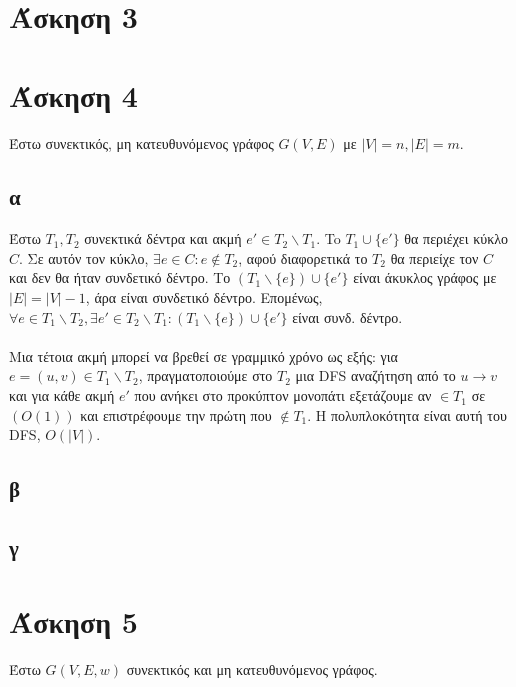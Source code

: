 \documentclass[12pt,a4paper]{article}
\begin{document}
  \section{Άσκηση 3}
  
  \section{Άσκηση 4}

  Έστω συνεκτικός, μη κατευθυνόμενος γράφος \( G(V, E) \) με \( |V| = n,
  |E| = m \).

  \subsection{α}

  Έστω \(T_1, T_2\) συνεκτικά δέντρα και ακμή \(e' \in T_2 \backslash T_1\).
  To \(T_1 \cup \{e'\}\) θα περιέχει κύκλο \(C\). Σε αυτόν τον κύκλο, \(\exists
  e \in C: e \notin T_2\), αφού διαφορετικά το \(Τ_2\) θα περιείχε τον \(C\)
  και δεν θα ήταν συνδετικό δέντρο. Το \((T_1 \backslash \{e\}) \cup \{e'\} \)
  είναι άκυκλος γράφος με \(|E| = |V| - 1\), άρα είναι συνδετικό δέντρο.
  Επομένως, \(\forall e \in T_1 \backslash T_2, \exists e' \in T_2 \backslash
  T_1: (T_1 \backslash \{e\}) \cup \{e'\}\) είναι συνδ. δέντρο.
  \\
  \\
  Μια τέτοια ακμή μπορεί να βρεθεί σε γραμμικό χρόνο ως εξής: για \(e = (u, v)
  \in T_1 \backslash T_2 \), πραγματοποιούμε στο \(T_2 \) μια {\latintext DFS}
  αναζήτηση από το \(u \rightarrow v\) και για κάθε ακμή \(e'\) που ανήκει στο
  προκύπτον μονοπάτι εξετάζουμε αν \(\in Τ_1\) σε \((O(1))\) και επιστρέφουμε 
  την πρώτη που \(\notin T_1\). Η πολυπλοκότητα είναι αυτή του {\latintext DFS},
  \(O(|V|)\).
  
  \subsection{β}

  \subsection{γ}

  \section{Άσκηση 5}

  Έστω \(G(V, E, w)\) συνεκτικός και μη κατευθυνόμενος γράφος.
\end{document}
